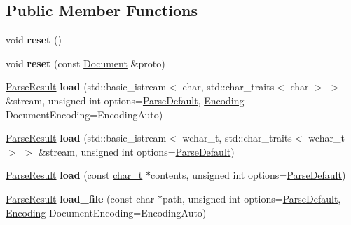 \subsection*{Public Member Functions}
\begin{DoxyCompactItemize}
\item 
\hypertarget{classphys_1_1xml_1_1Document_aadb3e68da9cf95b1193f915136f9a7e5}{
void {\bfseries reset} ()}
\label{dd/d44/classphys_1_1xml_1_1Document_aadb3e68da9cf95b1193f915136f9a7e5}

\item 
\hypertarget{classphys_1_1xml_1_1Document_a8d79b0e71457e8a64f331fd4cc117a86}{
void {\bfseries reset} (const \hyperlink{classphys_1_1xml_1_1Document}{Document} \&proto)}
\label{dd/d44/classphys_1_1xml_1_1Document_a8d79b0e71457e8a64f331fd4cc117a86}

\item 
\hypertarget{classphys_1_1xml_1_1Document_a481bb17790901c270163dc1b7f4824e8}{
\hyperlink{structphys_1_1xml_1_1ParseResult}{ParseResult} {\bfseries load} (std::basic\_\-istream$<$ char, std::char\_\-traits$<$ char $>$ $>$ \&stream, unsigned int options=\hyperlink{namespacephys_1_1xml_aa6b8f7f8c2322fd683a235b498834d60}{ParseDefault}, \hyperlink{namespacephys_1_1xml_a420f5de782438f88160321385bea2015}{Encoding} DocumentEncoding=EncodingAuto)}
\label{dd/d44/classphys_1_1xml_1_1Document_a481bb17790901c270163dc1b7f4824e8}

\item 
\hypertarget{classphys_1_1xml_1_1Document_acb57d77f011b7544475c7a799f6f7f10}{
\hyperlink{structphys_1_1xml_1_1ParseResult}{ParseResult} {\bfseries load} (std::basic\_\-istream$<$ wchar\_\-t, std::char\_\-traits$<$ wchar\_\-t $>$ $>$ \&stream, unsigned int options=\hyperlink{namespacephys_1_1xml_aa6b8f7f8c2322fd683a235b498834d60}{ParseDefault})}
\label{dd/d44/classphys_1_1xml_1_1Document_acb57d77f011b7544475c7a799f6f7f10}

\item 
\hypertarget{classphys_1_1xml_1_1Document_a6a0f671943e92d5a341ddabee3f80b5d}{
\hyperlink{structphys_1_1xml_1_1ParseResult}{ParseResult} {\bfseries load} (const \hyperlink{namespacephys_1_1xml_afc87705cd1c2917d87b879715a2d8f6e}{char\_\-t} $\ast$contents, unsigned int options=\hyperlink{namespacephys_1_1xml_aa6b8f7f8c2322fd683a235b498834d60}{ParseDefault})}
\label{dd/d44/classphys_1_1xml_1_1Document_a6a0f671943e92d5a341ddabee3f80b5d}

\item 
\hypertarget{classphys_1_1xml_1_1Document_a499bf5d32e87eea40fcda0161fcbfb06}{
\hyperlink{structphys_1_1xml_1_1ParseResult}{ParseResult} {\bfseries load\_\-file} (const char $\ast$path, unsigned int options=\hyperlink{namespacephys_1_1xml_aa6b8f7f8c2322fd683a235b498834d60}{ParseDefault}, \hyperlink{namespacephys_1_1xml_a420f5de782438f88160321385bea2015}{Encoding} DocumentEncoding=EncodingAuto)}
\label{dd/d44/classphys_1_1xml_1_1Document_a499bf5d32e87eea40fcda0161fcbfb06}


\end{DoxyCompactItemize}
